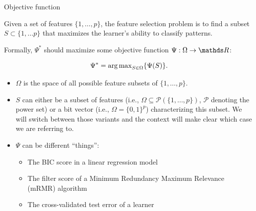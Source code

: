 \documentclass[11pt,compress,t,notes=noshow, xcolor=table]{beamer}
\begin{document}
  \begin{vbframe}{Objective function}

    \small

    Given a set of features $\{1, \dots, p\}$, the feature selection problem is to find a subset $S \subset \{ 1, \dots p \}$ that
    maximizes the learner's ability to classify patterns.

    Formally, $\Psi^*$ should maximize some objective function
    $\Psi: \Omega \rightarrow \R$:


    $$\Psi^* = \operatorname{arg\,max}_{{S \in \Omega}} \{ \Psi(S) \}.$$

    \begin{itemize}
     \item $\Omega$ is the space of all possible feature subsets of $\{ 1, \dots, p \}$.

      \item $S$ can either be a subset of features (i.e., $\Omega \subseteq \mathcal{P}(\{ 1, \dots, p \})$, $\mathcal{P}$ denoting the power set) or a bit vector (i.e., $\Omega = \{0, 1\}^p$) characterizing this subset. We will switch between those variants and the context will make clear which case we are referring to.

      \item $\Psi$ can be different \enquote{things}:
      \begin{itemize}
        \small
        \item The BIC score in a linear regression model
        \item The filter score of a Minimum Redundancy Maximum Relevance (mRMR) algorithm
        \item The cross-validated test error of a learner
      
      \end{itemize}
    \end{itemize}

    \normalsize

    \framebreak


\end{vbframe}
\end{document}
